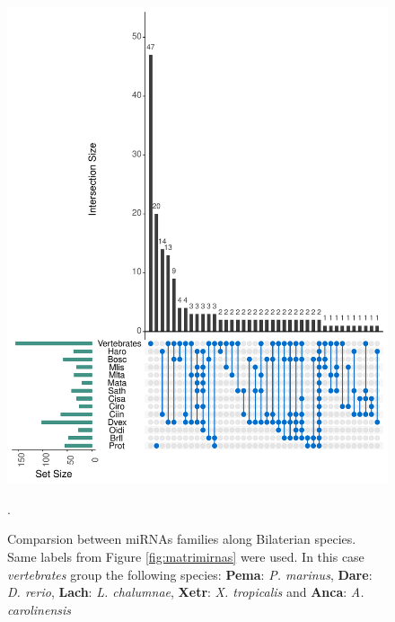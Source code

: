 \documentclass[11pt]{article}
\begin{document}
\begin{figure}[ht]
\centering
\includegraphics[scale=0.5]{./Images/vennmiRNAs.pdf}
\caption{Comparsion between miRNAs families along Bilaterian species. Same 
labels from Figure \ref{fig:matrimirnas} were used. In this case 
\textsl{vertebrates} group the following species: \textbf{Pema}: \textit{P. 
marinus}, \textbf{Dare}: \textit{D. rerio}, \textbf{Lach}: \textit{L. 
chalumnae}, 
\textbf{Xetr}: \textit{X. tropicalis} and \textbf{Anca}: \textit{A. 
carolinensis}}.
\label{fig:venn}
\end{figure}


\newpage



\end{document}
